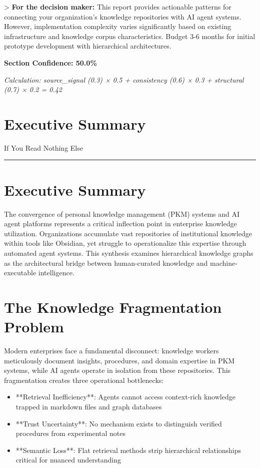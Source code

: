 \documentclass[a4paper,11pt]{article}
\newcommand{\ssubtitle}[1]{%
  \par\textcolor{subtitle}{\fontsize{12}{16}\selectfont #1}%
  \par\vspace{2pt}\textcolor{border}{\rule{\linewidth}{0.4pt}}\vspace{12pt}%
}
\begin{document}
> \textbf{For the decision maker:} This report provides actionable patterns for connecting your organization's knowledge repositories with AI agent systems. However, implementation complexity varies significantly based on existing infrastructure and knowledge corpus characteristics. Budget 3-6 months for initial prototype development with hierarchical architectures.


\textbf{Section Confidence: 50.0\%}\par
\textit{Calculation: source\_signal (0.3) × 0.5 + consistency (0.6) × 0.3 + structural (0.7) × 0.2 = 0.42}

\clearpage
\section{Executive Summary}
\ssubtitle{If You Read Nothing Else}

\section{Executive Summary}

The convergence of personal knowledge management (PKM) systems and AI agent platforms represents a critical inflection point in enterprise knowledge utilization. Organizations accumulate vast repositories of institutional knowledge within tools like Obsidian, yet struggle to operationalize this expertise through automated agent systems. This synthesis examines hierarchical knowledge graphs as the architectural bridge between human-curated knowledge and machine-executable intelligence.


\section{The Knowledge Fragmentation Problem}

Modern enterprises face a fundamental disconnect: knowledge workers meticulously document insights, procedures, and domain expertise in PKM systems, while AI agents operate in isolation from these repositories. This fragmentation creates three operational bottlenecks:


\begin{itemize}
  \item **Retrieval Inefficiency**: Agents cannot access context-rich knowledge trapped in markdown files and graph databases
  \item **Trust Uncertainty**: No mechanism exists to distinguish verified procedures from experimental notes
  \item **Semantic Loss**: Flat retrieval methods strip hierarchical relationships critical for nuanced understanding
\end{itemize}
\end{document}
